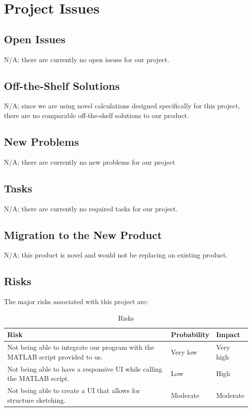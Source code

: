 \documentclass[12pt]{article}
\begin{document}
\section{Project Issues}

\subsection{Open Issues}

N/A; there are currently no open issues for our project.

\subsection{Off-the-Shelf Solutions}

N/A; since we are using novel calculations designed specifically for this project, there are no comparable off-the-shelf solutions to our product.

\subsection{New Problems}

N/A; there are currently no new problems for our project

\subsection{Tasks}

N/A; there are currently no required tasks for our project.

\subsection{Migration to the New Product}

N/A; this product is novel and would not be replacing an existing product.

\subsection{Risks}

The major risks associated with this project are:

\begin{table}[H]
\caption{Risks} \label{TblRisks}
\begin{tabular}{p{}|p{}|p{}}
\toprule
\textbf{Risk} & \textbf{Probability} & \textbf{Impact}\\
\midrule
Not being able to integrate our program with the MATLAB script provided to us. & Very low & Very high\\
\midrule
Not being able to have a responsive UI while calling the MATLAB script. & Low & High\\
\midrule
Not being able to create a UI that allows for structure sketching. & Moderate & Moderate\\
\bottomrule
\end{tabular}
\end{table}
\end{document}

